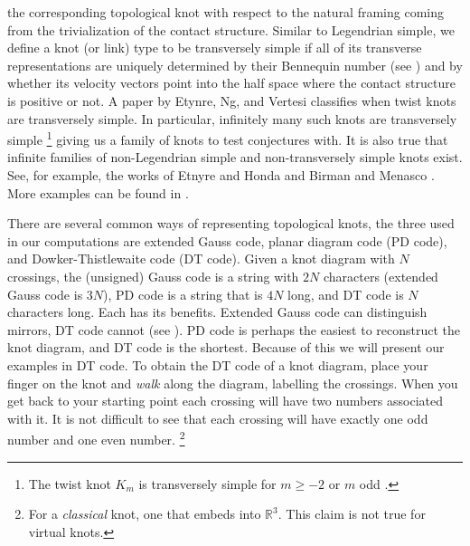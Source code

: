 \documentclass{article}
\theoremstyle{plain}
\begin{document}
        the corresponding topological knot with respect to the natural framing
        coming from the trivialization of the contact structure.
        Similar to Legendrian simple, we define a knot
        (or link) type to be transversely simple if all of its transverse
        representations are uniquely determined by their Bennequin number
        (see \cite{BirmanWrinkleTransversallySimpleKnots}) and by whether its
        velocity vectors point into the half space where the contact structure
        is positive or not. A paper by Etynre, Ng, and Vertesi
        \cite{EtnyreEtAlLegendrianAndTransverseTwistKnots}
        classifies when twist knots are transversely simple. In
        particular, infinitely many such knots are transversely simple%
        \footnote{%
            The twist knot $K_{m}$ is transversely simple for $m\geq{-2}$
            or $m$ odd \cite{EtnyreEtAlLegendrianAndTransverseTwistKnots}.
        }
        giving
        us a family of knots to test conjectures with. It is also true that
        infinite families of non-Legendrian simple and non-transversely simple
        knots exist. See, for example, the works of Etnyre and Honda
        \cite{EtnyreHondaCabling} and Birman and Menasco
        \cite{BirmanMenasco2006}. More examples can be found in
        \cite{Foldvari2019legnonsimple}.
        \par\hfill\par
        There are several common ways of representing topological knots, the
        three used in our computations are extended Gauss code, planar diagram
        code (PD code), and Dowker-Thistlewaite code (DT code). Given a knot
        diagram with $N$ crossings, the (unsigned) Gauss code is a string with $2N$
        characters (extended Gauss code is $3N$),
        PD code is a string that is $4N$ long, and DT code is $N$
        characters long. Each has its benefits. Extended Gauss code
        can distinguish mirrors, DT code cannot
        (see \cite{DowkerThistlethwaiteDTCode}).
        PD code is perhaps the easiest to
        reconstruct the knot diagram, and DT code is the shortest. Because of
        this we will present our examples in DT code. To obtain the DT code of
        a knot diagram, place your finger on the knot and \textit{walk} along
        the diagram, labelling the crossings. When you get back to your starting
        point each crossing will have two numbers associated with it. It is
        not difficult to see that each crossing will have exactly one odd number
        and one even number.%
        \footnote{%
            For a \textit{classical} knot,
            one that embeds into $\mathbb{R}^{3}$.
            This claim is not true for virtual knots.
        }
\end{document}
